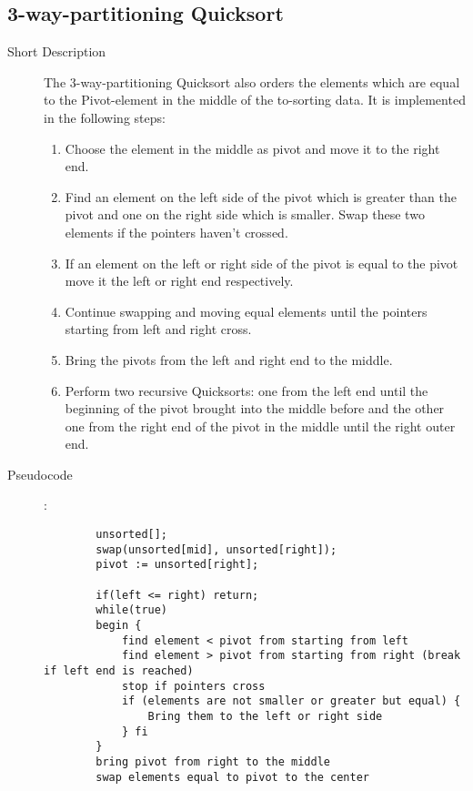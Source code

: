 \documentclass[11pt]{amsart}
\begin{document}
\subsection{3-way-partitioning Quicksort}
\begin{description}
	\item[Short Description] The 3-way-partitioning Quicksort also orders the elements which are equal to the Pivot-element in the middle of the to-sorting data.
It is implemented in the following steps:
		\begin{enumerate}
			\item Choose the element in the middle as pivot and move it to the right end.
			\item Find an element on the left side of the pivot which is greater than the pivot and one on the right side which is smaller. Swap these two elements if the pointers haven't crossed.
			\item If an element on the left or right side of the pivot is equal to the pivot move it the left or right end respectively. 
			\item Continue swapping and moving equal elements until the pointers starting from left and right cross.
			\item Bring the pivots from the left and right end to the middle.
			\item Perform two recursive Quicksorts: one from the left end until the beginning of the pivot brought into the middle before and the other one from the right end of the pivot in the middle until the right outer end.
		\end{enumerate}
	\item[Pseudocode]:
		\begin{lstlisting}		
		unsorted[];
		swap(unsorted[mid], unsorted[right]);
		pivot := unsorted[right];
			
		if(left <= right) return;
		while(true) 
		begin {
			find element < pivot from starting from left
			find element > pivot from starting from right (break if left end is reached)
			stop if pointers cross
			if (elements are not smaller or greater but equal) {
				Bring them to the left or right side
			} fi
		}
		bring pivot from right to the middle
		swap elements equal to pivot to the center
			

\end{lstlisting}
\end{description}
\end{document}
